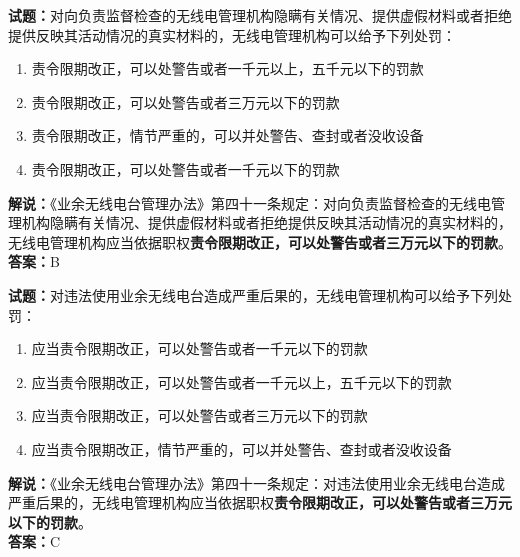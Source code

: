 \documentclass{ctexbook}
\begin{document}
\bigskip


\noindent\textbf{试题：}对向负责监督检查的无线电管理机构隐瞒有关情况、提供虚假材料或者拒绝提供反映其活动情况的真实材料的，无线电管理机构可以给予下列处罚：
\begin{enumerate}[leftmargin=3em]
	\item 责令限期改正，可以处警告或者一千元以上，五千元以下的罚款
	\item 责令限期改正，可以处警告或者三万元以下的罚款
	\item 责令限期改正，情节严重的，可以并处警告、查封或者没收设备
	\item 责令限期改正，可以处警告或者一千元以下的罚款
\end{enumerate}
\noindent\textbf{解说：}《业余无线电台管理办法》第四十一条规定：对向负责监督检查的无线电管理机构隐瞒有关情况、提供虚假材料或者拒绝提供反映其活动情况的真实材料的，无线电管理机构应当依据职权\textbf{责令限期改正，可以处警告或者三万元以下的罚款}。\\\textbf{答案：}B

\bigskip


\noindent\textbf{试题：}对违法使用业余无线电台造成严重后果的，无线电管理机构可以给予下列处罚：
\begin{enumerate}[leftmargin=3em]
	\item 应当责令限期改正，可以处警告或者一千元以下的罚款
	\item 应当责令限期改正，可以处警告或者一千元以上，五千元以下的罚款
	\item 应当责令限期改正，可以处警告或者三万元以下的罚款
	\item 应当责令限期改正，情节严重的，可以并处警告、查封或者没收设备
\end{enumerate}
\noindent\textbf{解说：}《业余无线电台管理办法》第四十一条规定：对违法使用业余无线电台造成严重后果的，无线电管理机构应当依据职权\textbf{责令限期改正，可以处警告或者三万元以下的罚款}。\\\textbf{答案：}C


\end{document}
